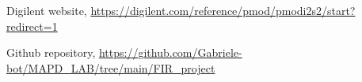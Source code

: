 \documentclass[11pt, a4paper]{article}
\begin{document}
\begin{thebibliography}{99}
    
        Digilent website, 
        \url{https://digilent.com/reference/pmod/pmodi2s2/start?redirect=1}
        
        Github repository, 
        \url{https://github.com/Gabriele-bot/MAPD_LAB/tree/main/FIR_project}
        
    \end{thebibliography}
\end{document}
